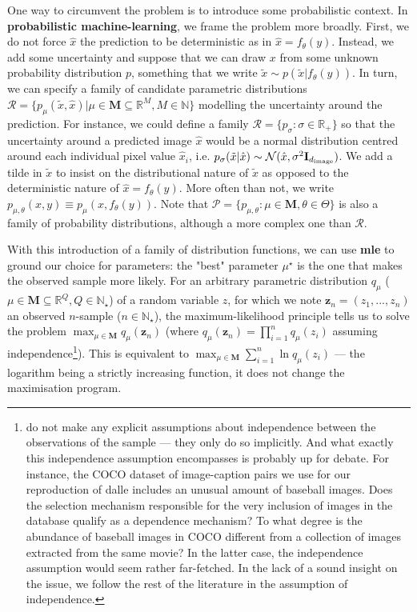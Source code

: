 \documentclass{article}
\begin{document}
\begin{multicols}{2}
One way to circumvent the problem is to introduce some probabilistic context. In \textbf{probabilistic machine-learning}, we frame the problem more broadly. First, we do not force $\hat x$ the prediction to be deterministic as in $\hat x=f_\theta(y)$. Instead, we add some uncertainty and suppose that we can draw $x$ from some unknown probability distribution $p$, something that we write $\tilde x \sim p(\tilde x|f_\theta(y))$. In turn, we can specify a family of candidate parametric distributions $\mathcal{R}=\{p_\mu(\tilde x, \hat x)|\mu \in \mathbf{M}\subseteq \mathbb{R}^M, M\in\mathbb{N}\}$ modelling the uncertainty around the prediction. For instance, we could define a family $\mathcal{R}=\{p_\sigma:\sigma \in \mathbb{R}_+\}$ so that the uncertainty around a predicted image $\hat x$ would be a normal distribution centred around each individual pixel value $\hat x_i$, i.e. $p_{\sigma}(\tilde x | \hat x)\sim 
\mathcal{N}(\hat x, \sigma^2 \mathbf{I}_{d_{\mathrm{image}}})$. We add a tilde in $\tilde x$ to insist on the distributional nature of $\tilde x$ as opposed to the deterministic nature of $\hat x=f_\theta(y)$. More often than not, we write $p_{\mu,\theta}(x,y)\equiv p_\mu(x, f_\theta(y))$. Note that $\mathcal{P}=\{p_{\mu,\theta}:\mu \in\mathbf{M},\theta\in\Theta\}$ is also a family of probability distributions, although a more complex one than $\mathcal{R}$.

With this introduction of a family of distribution functions, we can use \textbf{\gls{mle}} to ground our choice for parameters: the "best" parameter $\mu^\star$ is the one that makes the observed sample more likely. For an arbitrary parametric distribution $q_\mu$ ($\mu \in \mathbf{M} \subseteq \mathbb{R}^Q, Q \in \mathbb{N}_\star$) of a random variable $z$, for which we note $\mathbf{z}_n=(z_1, ..., z_n)$ an observed $n$-sample ($n \in \mathbb{N}_\star$), the maximum-likelihood principle tells us to solve the problem $\max_{\mu \in \mathbf{M}} q_\mu(\mathbf{z}_n)$ (where $q_\mu(\mathbf{z}_n)=\prod_{i=1}^nq_\mu(z_i)$ assuming independence\footnote{\citet{zeroshot} do not make any explicit assumptions about independence between the observations of the sample — they only do so implicitly. And what exactly this independence assumption encompasses is probably up for debate. For instance, the COCO dataset of image-caption pairs we use for our reproduction of \gls{dalle} includes an unusual amount of baseball images. Does the selection mechanism responsible for the very inclusion of images in the database qualify as a dependence mechanism? To what degree is the abundance of baseball images in COCO different from a collection of images extracted from the same movie? In the latter case, the independence assumption would seem rather far-fetched. In the lack of a sound insight on the issue, we follow the rest of the literature in the assumption of independence.}). This is equivalent to $\max_{\mu \in \mathbf{M}} \sum_{i=1}^n \ln q_\mu(z_i)$ — the logarithm being a strictly increasing function, it does not change the maximisation program.


\end{multicols}
\end{document}
